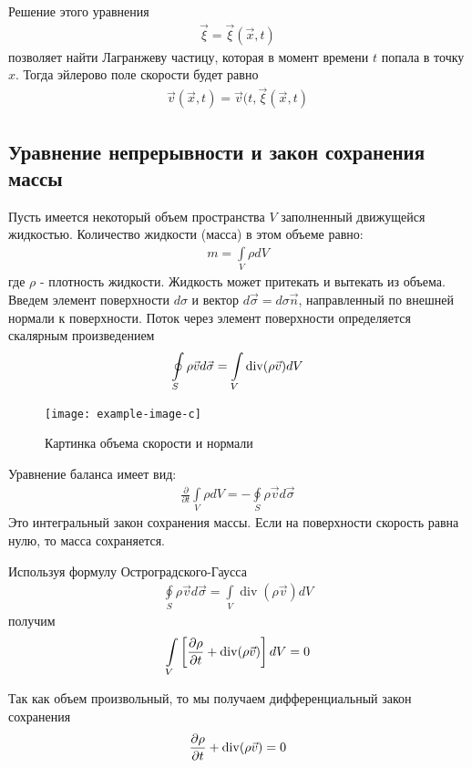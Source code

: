 Решение этого уравнения 
\begin{align*} 
\vec{\xi}=\vec{\xi}(\vec{x}, t)
\end{align*}
позволяет найти Лагранжеву частицу, которая в момент времени $t$ попала в точку $x$. Тогда эйлерово поле скорости будет равно
\begin{align*} 
\vec{v}(\vec{x}, t)=\vec{v}(t, \vec{\xi}(\vec{x}, t)
\end{align*}
\subsection{Уравнение непрерывности и закон сохранения массы}
Пусть имеется некоторый объем пространства $V$ заполненный движущейся  жидкостью. Количество жидкости (масса) в этом объеме равно:
\begin{align*} 
m=\int\limits_{V} \rho d V
\end{align*}
где $\rho$ - плотность жидкости. Жидкость может притекать и вытекать из объема. Введем элемент поверхности $ d \sigma $ и вектор $ d \vec{\sigma}=d \sigma \vec{n} $, направленный по внешней нормали к поверхности. Поток через элемент поверхности определяется скалярным произведением
\begin{align*}
\oint\limits_{S} \rho \vec{v} d \vec{\sigma}=\int\limits_{V} \operatorname{div}(\rho \vec{v}) d V
\end{align*}

\begin{figure}[h]
	\centering
	\texttt{[image: example-image-c]}
	\caption{Картинка объема скорости и нормали}
	\label{fig:figure4}
\end{figure}

Уравнение баланса имеет вид:
\begin{align*} 
\frac{\partial}{\partial t} \int\limits_{V} \rho d V=-\oint\limits_{S} \rho \vec{v} d \vec{\sigma}
\end{align*}
Это интегральный закон сохранения массы. Если на поверхности скорость равна нулю, то масса сохраняется.

Используя формулу Остроградского-Гаусса
\begin{align*} 
\oint\limits_{S} \rho \vec{v} d \vec{\sigma}=\int\limits_{V} \operatorname{div}(\rho \vec{v}) d V
\end{align*}
получим 
\begin{align*} 
\int\limits_{V}\left[\frac{\partial \rho}{\partial t}+\operatorname{div}(\rho \vec{v})\right] d V=0
\end{align*}

Так как объем произвольный, то мы получаем дифференциальный закон сохранения
\begin{align*} 
\frac{\partial \rho}{\partial t}+\operatorname{div}(\rho \vec{v})=0
\end{align*}

